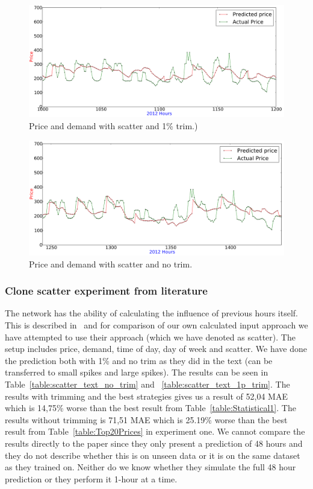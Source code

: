 \begin{figure}[H]
\centering
\includegraphics[width=\linewidth]{billeder/PriceExperimentalAnalysis/X3_Price_Consump_1pTrim.png}
\caption{Price and demand with scatter and 1\% trim.)}
\label{fig:X3_Price_Consump_1pTrim}
\end{figure}

\begin{figure}[H]
\centering
\includegraphics[width=\linewidth]{billeder/PriceExperimentalAnalysis/X3_Price_Consump_NoTrim.png}
\caption{Price and demand with scatter and no trim.}
\label{fig:X3_Price_Consump_NoTrim}
\end{figure}

\subsubsection{Clone scatter experiment from literature}
The network has the ability of calculating the influence of previous hours itself. This is described in~\cite{singhal2011electricity} and for comparison of our own calculated input approach we have attempted to use their approach (which we have denoted as scatter). The setup includes price, demand, time of day, day of week and scatter. We have done the prediction both with 1\% and no trim as they did in the text (can be transferred to small spikes and large spikes). The results can be seen in Table~\ref{table:scatter_text_no_trim} and ~\ref{table:scatter_text_1p_trim}. The results with trimming and the best strategies gives us a result of 52,04 MAE which is 14,75\% worse than the best result from Table~\ref{table:Statistical1}. The results without trimming is 71,51 MAE which is 25.19\% worse than the best result from Table~\ref{table:Top20Prices} in experiment one. We cannot compare the results directly to the paper since they only present a prediction of 48 hours and they do not describe whether this is on unseen data or it is on the same dataset as they trained on. Neither do we know whether they simulate the full 48 hour prediction or they perform it 1-hour at a time.

